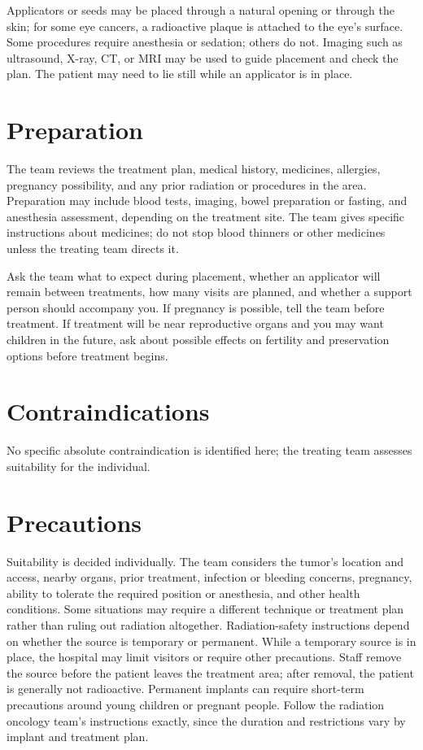 Applicators or seeds may be placed through a natural opening or through the skin; for some eye cancers, a radioactive plaque is attached to the eye's surface. Some procedures require anesthesia or sedation; others do not. Imaging such as ultrasound, X-ray, CT, or MRI may be used to guide placement and check the plan. The patient may need to lie still while an applicator is in place.

\section*{Preparation}
The team reviews the treatment plan, medical history, medicines, allergies, pregnancy possibility, and any prior radiation or procedures in the area. Preparation may include blood tests, imaging, bowel preparation or fasting, and anesthesia assessment, depending on the treatment site. The team gives specific instructions about medicines; do not stop blood thinners or other medicines unless the treating team directs it.

Ask the team what to expect during placement, whether an applicator will remain between treatments, how many visits are planned, and whether a support person should accompany you. If pregnancy is possible, tell the team before treatment. If treatment will be near reproductive organs and you may want children in the future, ask about possible effects on fertility and preservation options before treatment begins.

\section*{Contraindications}
No specific absolute contraindication is identified here; the treating team assesses suitability for the individual.

\section*{Precautions}
Suitability is decided individually. The team considers the tumor's location and access, nearby organs, prior treatment, infection or bleeding concerns, pregnancy, ability to tolerate the required position or anesthesia, and other health conditions. Some situations may require a different technique or treatment plan rather than ruling out radiation altogether. Radiation-safety instructions depend on whether the source is temporary or permanent. While a temporary source is in place, the hospital may limit visitors or require other precautions. Staff remove the source before the patient leaves the treatment area; after removal, the patient is generally not radioactive. Permanent implants can require short-term precautions around young children or pregnant people. Follow the radiation oncology team's instructions exactly, since the duration and restrictions vary by implant and treatment plan.

